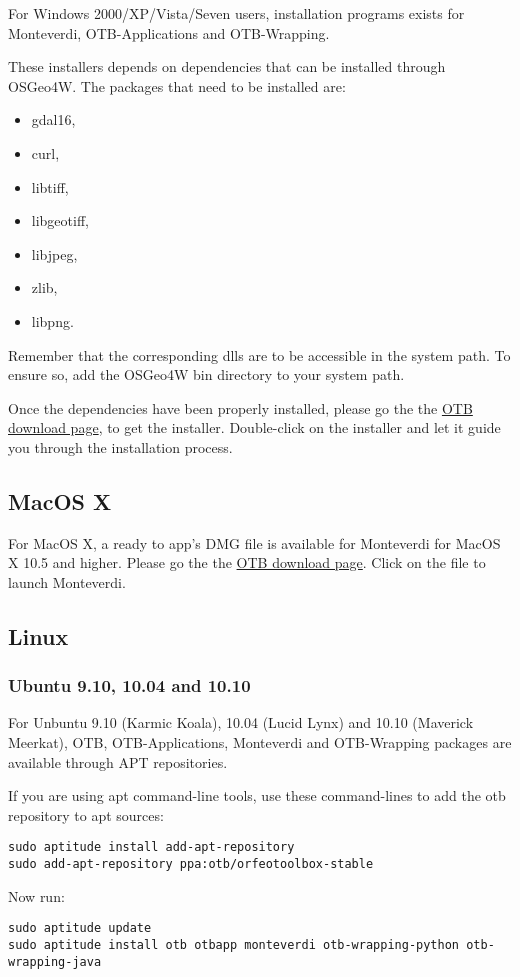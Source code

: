 For Windows 2000/XP/Vista/Seven users, installation programs exists for Monteverdi, 
OTB-Applications and OTB-Wrapping. 

These installers depends on dependencies that can be installed through OSGeo4W. The packages that
need to be installed are:
\begin{itemize}
\item gdal16,
\item curl, 
\item libtiff,
\item libgeotiff,
\item libjpeg,
\item zlib, 
\item libpng.
\end{itemize}
Remember that the corresponding dlls are to be accessible in the system path. To ensure so, add
the OSGeo4W bin directory to your system path.

 Once the dependencies have been properly installed, please go the the 
\href{http://sourceforge.net/projects/orfeo-toolbox/}{OTB download page}, to
get the installer. Double-click on the installer and let it guide you through the 
installation process.

\subsection{MacOS X}
\label{ssec:mac_binaries}

For MacOS X, a ready to app's DMG file is available for Monteverdi for MacOS X 10.5 and higher. 
Please go the the \href{http://sourceforge.net/projects/orfeo-toolbox/}{OTB download page}.
Click on the file to launch Monteverdi.

\subsection{Linux}

\subsubsection{Ubuntu 9.10, 10.04 and 10.10}
\label{ssec:ubuntu_binaries}
For Unbuntu 9.10 (Karmic Koala), 10.04 (Lucid Lynx) and 10.10 (Maverick Meerkat), OTB, 
OTB-Applications, Monteverdi and OTB-Wrapping packages are available through APT repositories.

If you are using apt command-line tools, use these command-lines to add the otb repository to apt sources:
\begin{verbatim}
sudo aptitude install add-apt-repository 
sudo add-apt-repository ppa:otb/orfeotoolbox-stable
\end{verbatim}
Now run:
\begin{verbatim}
sudo aptitude update
sudo aptitude install otb otbapp monteverdi otb-wrapping-python otb-wrapping-java
\end{verbatim}

